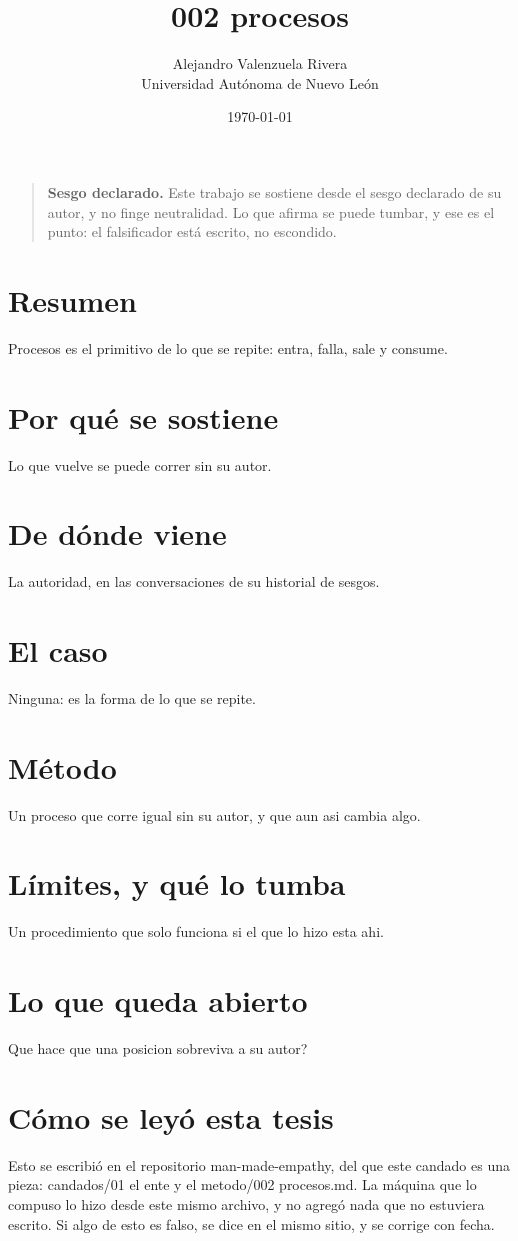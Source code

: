 \documentclass[11pt,a4paper]{article}
\title{002 procesos}
\author{Alejandro Valenzuela Rivera\\\small Universidad Autónoma de Nuevo León}
\date{\today}
\begin{document}
\maketitle

\begin{quote}
\textbf{Sesgo declarado.} Este trabajo se sostiene desde el sesgo declarado de su autor, y no finge neutralidad. Lo que afirma se puede tumbar, y ese es el punto: el falsificador está escrito, no escondido.
\end{quote}

\section*{Resumen}
Procesos es el primitivo de lo que se repite: entra, falla, sale y consume.

\section{Por qué se sostiene}
Lo que vuelve se puede correr sin su autor.

\section{De dónde viene}
La autoridad, en las conversaciones de su historial de sesgos.

\section{El caso}
Ninguna: es la forma de lo que se repite.

\section{Método}
Un proceso que corre igual sin su autor, y que aun asi cambia algo.

\section{Límites, y qué lo tumba}
Un procedimiento que solo funciona si el que lo hizo esta ahi.

\section{Lo que queda abierto}
\textquestiondown{}Que hace que una posicion sobreviva a su autor?

\section*{Cómo se leyó esta tesis}
Esto se escribió en el repositorio man-made-empathy, del que este candado es una pieza: candados/01 el ente y el metodo/002 procesos.md. La máquina que lo compuso lo hizo desde este mismo archivo, y no agregó nada que no estuviera escrito. Si algo de esto es falso, se dice en el mismo sitio, y se corrige con fecha.
\end{document}
